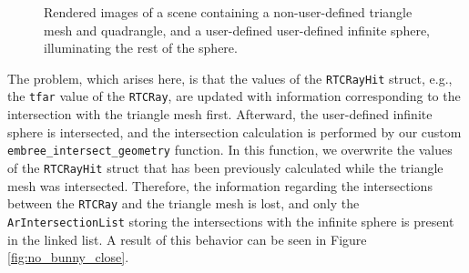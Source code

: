 \begin{figure}[!tbp]
	\centering
	\hfil
	\caption{Rendered images of a scene containing a non-user-defined triangle mesh and quadrangle, and a user-defined user-defined infinite sphere, illuminating the rest of the sphere.}
	\label{fig:no_bunny}
\end{figure}


The problem, which arises here, is that the values of the \texttt{RTCRayHit} struct, e.g., the \texttt{tfar} value of the \texttt{RTCRay}, are updated with information corresponding to the intersection with the triangle mesh first. Afterward, the user-defined infinite sphere is intersected, and the intersection calculation is performed by our custom \texttt{embree\_intersect\_geometry} function. In this function, we overwrite the values of the \texttt{RTCRayHit} struct that has been previously calculated while the triangle mesh was intersected. Therefore, the information regarding the intersections between the \texttt{RTCRay} and the triangle mesh is lost, and only the \texttt{ArIntersectionList} storing the intersections with the infinite sphere is present in the linked list. A result of this behavior can be seen in Figure \ref{fig:no_bunny_close}.

